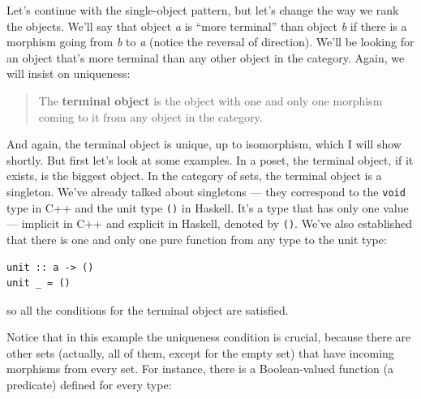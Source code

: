 Let's continue with the single-object pattern, but let's change the way
we rank the objects. We'll say that object \emph{a} is ``more terminal''
than object \emph{b} if there is a morphism going from \emph{b} to
\emph{a} (notice the reversal of direction). We'll be looking for an
object that's more terminal than any other object in the category.
Again, we will insist on uniqueness:

\begin{quote}
The \textbf{terminal object} is the object with one and only one
morphism coming to it from any object in the category.
\end{quote}

\begin{figure}[H]
  \centering
\end{figure}

\noindent
And again, the terminal object is unique, up to isomorphism, which I
will show shortly. But first let's look at some examples. In a poset,
the terminal object, if it exists, is the biggest object. In the
category of sets, the terminal object is a singleton. We've already
talked about singletons --- they correspond to the \texttt{void} type in
C++ and the unit type \texttt{()} in Haskell. It's a type that has only
one value --- implicit in C++ and explicit in Haskell, denoted by
\texttt{()}. We've also established that there is one and only one pure
function from any type to the unit type:

\begin{verbatim}
unit :: a -> ()
unit _ = ()
\end{verbatim}

so all the conditions for the terminal object are satisfied.

Notice that in this example the uniqueness condition is crucial, because
there are other sets (actually, all of them, except for the empty set)
that have incoming morphisms from every set. For instance, there is a
Boolean-valued function (a predicate) defined for every type:

